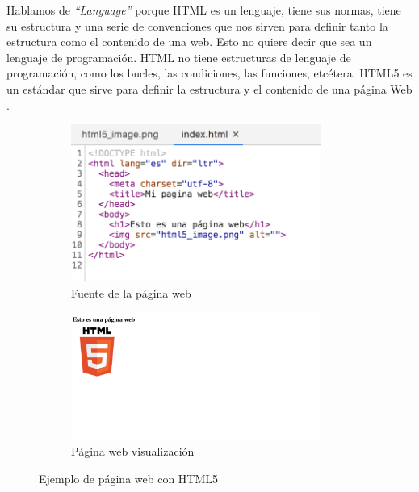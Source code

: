 Hablamos de \textit{``Language''} porque HTML es un lenguaje, tiene sus normas, tiene su estructura y una serie de convenciones que nos sirven para definir tanto la estructura como el contenido de una web. Esto no quiere decir que sea un lenguaje de programación. HTML no tiene estructuras de lenguaje de programación, como los bucles, las condiciones, las funciones, etcétera. HTML5 es un estándar que sirve para definir la estructura y el contenido de una página Web \cite{html2}. 

\begin{figure}[H]
    \begin{subfigure}[b]{0.5\textwidth}
  \centering
    \includegraphics[width=0.9\textwidth, height=0.5\textwidth]{chapters/images/simplehtmlpage.png}
    \caption{Fuente de la página web}
    \label{fig:f2}
  \end{subfigure}
  \begin{subfigure}[b]{0.5\textwidth}
  \centering
    \includegraphics[width=0.9\textwidth, height=0.5\textwidth]{chapters/images/simplehtml.png}
    \caption{Página web visualización}
    \label{fig:f1}
  \end{subfigure}
  \hfill
  
  \caption{Ejemplo de página web con HTML5}
\end{figure}

